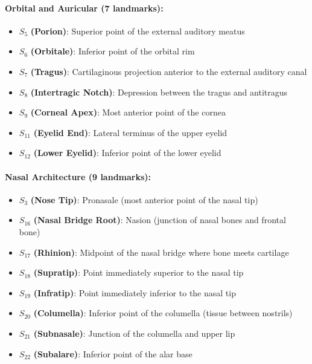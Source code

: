\paragraph{Orbital and Auricular (7 landmarks):}
\begin{itemize}
    \item $S_5$ \textbf{(Porion)}: Superior point of the external auditory meatus
    \item $S_6$ \textbf{(Orbitale)}: Inferior point of the orbital rim
    \item $S_7$ \textbf{(Tragus)}: Cartilaginous projection anterior to the external auditory canal
    \item $S_8$ \textbf{(Intertragic Notch)}: Depression between the tragus and antitragus
    \item $S_9$ \textbf{(Corneal Apex)}: Most anterior point of the cornea
    \item $S_{11}$ \textbf{(Eyelid End)}: Lateral terminus of the upper eyelid
    \item $S_{12}$ \textbf{(Lower Eyelid)}: Inferior point of the lower eyelid
\end{itemize}

\paragraph{Nasal Architecture (9 landmarks):}
\begin{itemize}
    \item $S_3$ \textbf{(Nose Tip)}: Pronasale (most anterior point of the nasal tip)
    \item $S_{16}$ \textbf{(Nasal Bridge Root)}: Nasion (junction of nasal bones and frontal bone)
    \item $S_{17}$ \textbf{(Rhinion)}: Midpoint of the nasal bridge where bone meets cartilage
    \item $S_{18}$ \textbf{(Supratip)}: Point immediately superior to the nasal tip
    \item $S_{19}$ \textbf{(Infratip)}: Point immediately inferior to the nasal tip
    \item $S_{20}$ \textbf{(Columella)}: Inferior point of the columella (tissue between nostrils)
    \item $S_{21}$ \textbf{(Subnasale)}: Junction of the columella and upper lip
    \item $S_{22}$ \textbf{(Subalare)}: Inferior point of the alar base
\end{itemize}


